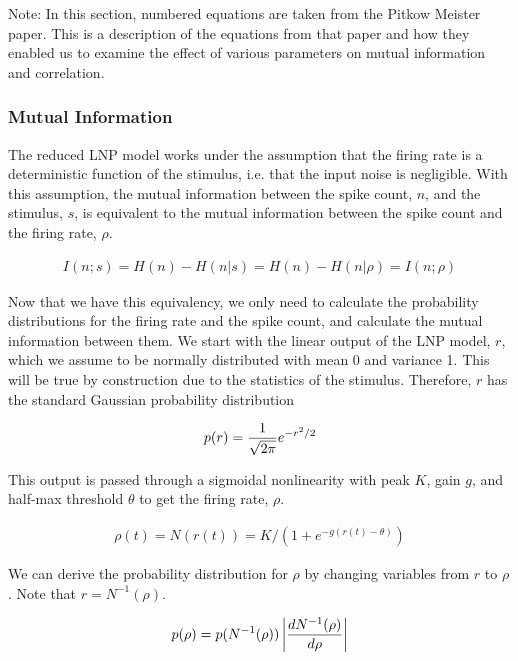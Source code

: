\documentclass[12pt]{article}
\begin{document}
Note: In this section, numbered equations are taken from the Pitkow Meister paper. This is a description of the equations from that paper and how they enabled us to examine the effect of various parameters on mutual information and correlation.

\subsubsection{Mutual Information}

The reduced LNP model works under the assumption that the firing rate is a deterministic function of the stimulus, i.e. that the input noise is negligible. With this assumption, the mutual information between the spike count, $n$, and the stimulus, $s$, is equivalent to the mutual information between the spike count and the firing rate, $\rho$.

\begin{align}
\displaystyle I(n;s) = H(n)-H(n|s)=H(n)-H(n|\rho)=I(n;\rho) \tag{18}
\end{align}

\noindent Now that we have this equivalency, we only need to calculate the probability distributions for the firing rate and the spike count, and calculate the mutual information between them. We start with the linear output of the LNP model, $r$, which we assume to be normally distributed with mean 0 and variance 1. This will be true by construction due to the statistics of the stimulus. Therefore, $r$ has the standard Gaussian probability distribution

\begin{align}
\displaystyle p(r) = \frac{1}{\sqrt{2\pi}}e^{-r^2/2} \notag
\end{align}

\noindent This output is passed through a sigmoidal nonlinearity with peak $K$, gain $g$, and half-max threshold $\theta$ to get the firing rate, $\rho$.

\begin{align}
\displaystyle \rho(t) = N(r(t)) = K \Big/ \left(1+e^{-g(r(t)-\theta)}\right) \tag{8, 10}
\end{align}

\noindent We can derive the probability distribution for $\rho$ by changing variables from $r$ to $\rho$. Note that $r=N^{-1}(\rho)$.

\begin{align}
\displaystyle p(\rho) = p(N^{-1}(\rho))\left | \frac{dN^{-1}(\rho)}{d\rho} \right | \notag
\end{align}
\end{document}
